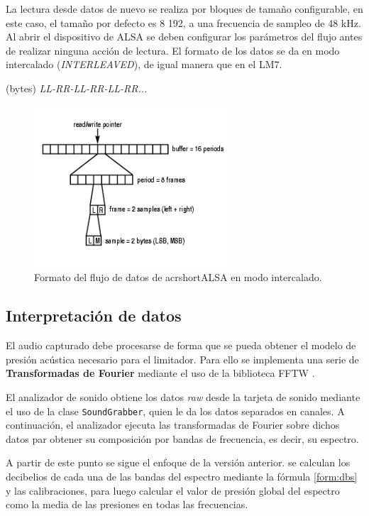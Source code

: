 La lectura desde datos de nuevo se realiza por bloques de tamaño configurable, en este caso, el tamaño por defecto es 8 192, a una frecuencia de sampleo de 48 kHz. Al abrir el dispositivo de \acrshort{ALSA} se deben configurar los parámetros del flujo antes de realizar ninguna acción de lectura. El formato de los datos se da en modo intercalado (\textit{INTERLEAVED}), de igual manera que en el \acrshort{LM7}.

\begin{center}
(bytes) \textit{LL-RR-LL-RR-LL-RR...}
\end{center}


\begin{figure}[h]
    \centering
    \includegraphics[width=0.65\textwidth]{imagenes/alsa-pcm-readi.jpg}
    \caption{Formato del flujo de datos de  acrshort{ALSA} en modo intercalado.}
    \label{img:alsa-pcm-readi}
\end{figure}


\subsection{Interpretación de datos}

El audio capturado debe procesarse de forma que se pueda obtener el modelo de presión acústica necesario para el limitador. Para ello se implementa una serie de \textbf{Transformadas de Fourier} mediante el uso de la biblioteca \acrfull{FFTW} \cite{fftw}.

El analizador de sonido obtiene los datos \textit{raw} desde la tarjeta de sonido mediante el uso de la clase \verb|SoundGrabber|, quien le da los datos separados en canales. A continuación, el analizador ejecuta las transformadas de Fourier sobre dichos datos par obtener su composición por bandas de frecuencia, es decir, su espectro.

A partir de este punto se sigue el enfoque de la versión anterior. se calculan los decibelios de cada una de las bandas del espectro mediante la fórmula \ref{form:dbs} y las calibraciones, para luego calcular el valor de presión global del espectro como la media de las presiones en todas las frecuencias.

